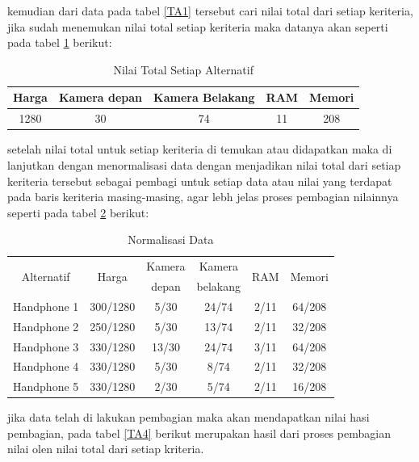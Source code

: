 \pagebreak

kemudian dari data pada tabel \ref{TA1} tersebut cari nilai total dari setiap keriteria, jika sudah menemukan nilai total setiap keriteria maka datanya akan seperti pada tabel \ref{TA2} berikut:

\begin{table}[h]
\caption{Nilai Total Setiap Alternatif}
\centering
\begin{tabular}{|c|c|c|c|c|}
\hline
 Harga & Kamera depan & Kamera Belakang&RAM& Memori\\
\hline
1280& 30 & 74 & 11 & 208\\
\hline
\end{tabular}
\label{TA2}
\end{table}

setelah nilai total untuk setiap keriteria di temukan atau didapatkan maka di lanjutkan dengan menormalisasi data dengan menjadikan nilai total dari setiap keriteria tersebut sebagai pembagi untuk setiap data atau nilai yang terdapat pada baris keriteria masing-masing, agar lebh jelas proses pembagian nilainnya seperti pada tabel \ref{TA3} berikut:

\begin{table}[h]
\caption{Normalisasi Data}
\centering
\begin{tabular}{|c|c|c|c|c|c|}
\hline
\multirow{2}{*}{Alternatif} &\multirow{2}{*}{ Harga}& Kamera & Kamera&\multirow{2}{*}{RAM}& \multirow{2}{*}{Memori}\\
& & depan & belakang & &\\
\hline
Handphone 1 &300/1280& 5/30 & 24/74 &  2/11&64/208\\
\hline
Handphone 2 &250/1280 & 5/30 & 13/74 &  2/11&32/208\\
\hline
Handphone 3 &330/1280 & 13/30 & 24/74 &  3/11 &64/208\\
\hline
Handphone 4 &330/1280 & 5/30 & 8/74 &  2/11&32/208\\
\hline
Handphone 5 &330/1280 & 2/30 & 5/74 &  2/11&16/208\\
\hline

\end{tabular}
\label{TA3}
\end{table}

	jika data telah di lakukan pembagian maka akan mendapatkan nilai hasi pembagian, pada tabel \ref{TA4} berikut merupakan hasil dari proses pembagian nilai olen nilai total dari setiap kriteria.

